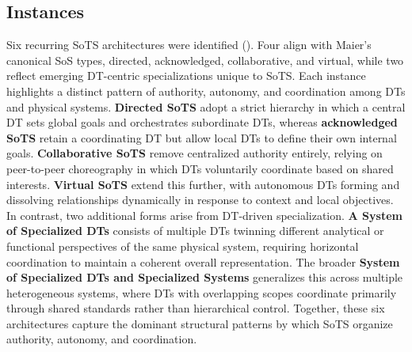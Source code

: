 \subsection{Instances}

Six recurring SoTS architectures were identified (). Four align with Maier's canonical SoS types, directed, acknowledged, collaborative, and virtual, while two reflect emerging DT-centric specializations unique to SoTS. Each instance highlights a distinct pattern of authority, autonomy, and coordination among DTs and physical systems. \textbf{Directed SoTS} adopt a strict hierarchy in which a central DT sets global goals and orchestrates subordinate DTs, whereas \textbf{acknowledged SoTS} retain a coordinating DT but allow local DTs to define their own internal goals. \textbf{Collaborative SoTS} remove centralized authority entirely, relying on peer-to-peer choreography in which DTs voluntarily coordinate based on shared interests. \textbf{Virtual SoTS} extend this further, with autonomous DTs forming and dissolving relationships dynamically in response to context and local objectives. In contrast, two additional forms arise from DT-driven specialization. \textbf{A System of Specialized DTs} consists of multiple DTs twinning different analytical or functional perspectives of the same physical system, requiring horizontal coordination to maintain a coherent overall representation. The broader \textbf{System of Specialized DTs and Specialized Systems} generalizes this across multiple heterogeneous systems, where DTs with overlapping scopes coordinate primarily through shared standards rather than hierarchical control. Together, these six architectures capture the dominant structural patterns by which SoTS organize authority, autonomy, and coordination.
